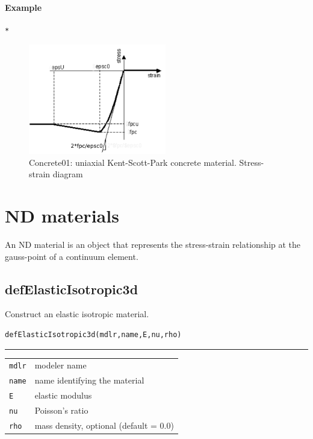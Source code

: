 \paragraph{Example}
\begin{verbatim}
*
\end{verbatim}

\begin{figure}[h]
\centering
\includegraphics[width=60mm]{materials/figures/Concrete01}
\caption{Concrete01: uniaxial Kent-Scott-Park concrete material. Stress-strain diagram}\label{Concrete01}
\end{figure}

\section{ND materials}
An ND material is an object that represents the stress-strain relationship at the gauss-point of a continuum element.

\subsection{defElasticIsotropic3d}
\noindent Construct an elastic isotropic material.
\begin{verbatim}
defElasticIsotropic3d(mdlr,name,E,nu,rho)
\end{verbatim}
\vspace{-10pt}
{\color{grayLines} \rule{\linewidth}{0.25pt}}
\begin{center}
\begin{tabular}{lp{10cm}}
{\tt mdlr} & modeler name \\
{\tt name} & name identifying the material\\
{\tt E} & elastic modulus \\
{\tt nu} & Poisson's ratio \\
{\tt rho} &  mass density, optional (default = 0.0)\\
\end{tabular}
\end{center}
